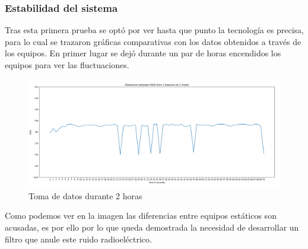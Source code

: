 \documentclass[a4paper ,12pt, onecolumn]{article}
\begin{document}
        \subsubsection{Estabilidad del sistema}
            Tras esta primera prueba se optó por ver hasta que punto la tecnología es precisa, para lo cual se trazaron gráficas comparativas
            con los datos obtenidos a través de los equipos. En primer lugar se dejó durante un par de horas encendidos los equipos para ver las 
            fluctuaciones.
            \begin{center}
                \begin{figure}[]
                    \centering
                    \includegraphics[width=1\textwidth]{../../Memmory/images/5min_beacon_rssi.PNG}
                    \caption{Toma de datos durante 2 horas}
                    \label{fig:mesh11}
                \end{figure}
            \end{center}
            Como podemos ver en la imagen las diferencias entre equipos estáticos son acusadas, es por ello por lo que queda demostrada la necesidad de
            desarrollar un filtro que anule este ruido radioeléctrico.
\end{document}
